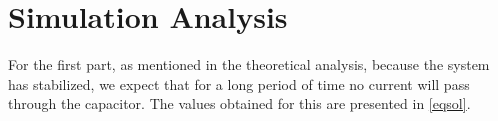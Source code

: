 \section{Simulation Analysis}

For the first part, as mentioned in the theoretical analysis, because the system has stabilized, we expect that for a long period of time no current will pass through the capacitor. The values obtained for this are presented in \ref{eqsol}.

